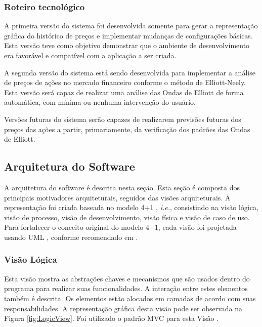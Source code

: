 \documentclass[12pt]{article}
\begin{document}
\subsubsection{Roteiro tecnológico}

A primeira versão do sistema foi desenvolvida somente para gerar a representação gráfica
do histórico de preços e implementar mudanças de configurações básicas. Esta versão teve
como objetivo demonstrar que o ambiente de desenvolvimento era favorável e compatível
com a aplicação a ser criada.

A segunda versão do sistema está sendo desenvolvida para implementar a análise de preços
de ações no mercado financeiro conforme o método de Elliott-Neely. Esta versão será capaz
de realizar uma análise das Ondas de Elliott de forma automática, com mínima ou nenhuma
intervenção do usuário.

Versões futuras do sistema serão capazes de realizarem previsões futuras dos preços das
ações a partir, primariamente, da verificação dos padrões das Ondas de Elliott.

\subsection{Arquitetura do Software}

A arquitetura do software é descrita nesta seção. Esta seção é composta dos principais
motivadores arquiteturais, seguidos das visões arquiteturais. A representação foi criada
baseada no modelo 4+1 \cite{Kruchten:1995}, \emph{i.e.}, consistindo na visão lógica,
visão de processo, visão de desenvolvimento, visão física e visão de caso de uso.
Para fortalecer o conceito original do modelo 4+1, cada visão foi projetada usando
UML \cite{UML}, conforme recomendado em \cite{FCG:2007}.

\subsubsection{Visão Lógica}

Esta visão mostra as abstrações chaves e mecanismos que são usados dentro do programa
para realizar suas funcionalidades. A interação entre estes elementos também é descrita.
Os elementos estão alocados em camadas de acordo com suas responsabilidades. A representação 
gráfica desta visão pode ser observada na Figura \ref{fig:LogicView}. Foi utilizado o
padrão MVC para esta Visão \cite{KrasnerPope:1988} \cite{Buschmann:1988}.
\end{document}
